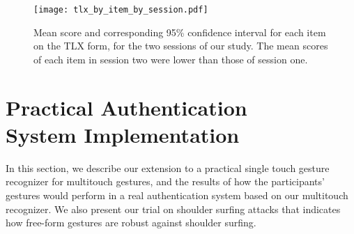 \documentclass{sig-alternate-10pt}
\begin{document}
\begin{figure}[!t]
\begin{center}

\texttt{[image: tlx\_by\_item\_by\_session.pdf]}
\caption{\label{fig:tlx_by_item_by_session} Mean score and corresponding 95\% confidence interval for each item on the TLX form, for the two sessions of our study. The mean scores of each item in session two were lower than those of session one.}
\vspace{-15pt}
\end{center}
\end{figure}



































\section{Practical Authentication \\ System Implementation}

In this section, we describe our extension to a practical
single touch gesture recognizer for multitouch gestures, and
the results of how the participants' gestures would perform in
a real authentication system based on our multitouch recognizer.
We also present our trial on shoulder surfing attacks that indicates
how free-form gestures are robust against shoulder surfing.
\end{document}
